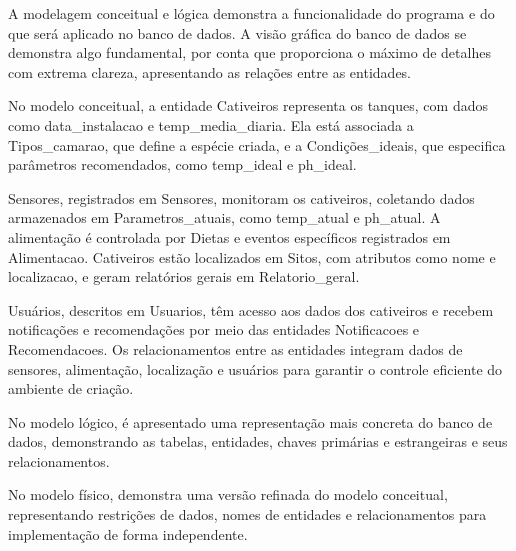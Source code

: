 \documentclass[
  a4paper,
  12pt,
  english,
  brazilian,
]{article}
\begin{document}
A modelagem conceitual e lógica demonstra a funcionalidade do programa e do que será aplicado no banco de dados. A visão gráfica do banco de dados se demonstra algo fundamental, por conta que proporciona o máximo de detalhes com extrema clareza, apresentando as relações entre as entidades.

No modelo conceitual, a entidade Cativeiros representa os tanques, com dados como data\_instalacao e temp\_media\_diaria. Ela está associada a Tipos\_camarao, que define a espécie criada, e a Condições\_ideais, que especifica parâmetros recomendados, como temp\_ideal e ph\_ideal.

Sensores, registrados em Sensores, monitoram os cativeiros, coletando dados armazenados em Parametros\_atuais, como temp\_atual e ph\_atual. A alimentação é controlada por Dietas e eventos específicos registrados em Alimentacao. Cativeiros estão localizados em Sitos, com atributos como nome e localizacao, e geram relatórios gerais em Relatorio\_geral.

Usuários, descritos em Usuarios, têm acesso aos dados dos cativeiros e recebem notificações e recomendações por meio das entidades Notificacoes e Recomendacoes. Os relacionamentos entre as entidades integram dados de sensores, alimentação, localização e usuários para garantir o controle eficiente do ambiente de criação.

No modelo lógico, é apresentado uma representação mais concreta do banco de dados, demonstrando as tabelas, entidades, chaves primárias e estrangeiras e seus relacionamentos.

No modelo físico, demonstra uma versão refinada do modelo conceitual, representando restrições de dados, nomes de entidades e relacionamentos para implementação de forma independente.

\newpage
\end{document}

